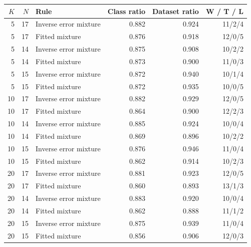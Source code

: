 \begin{tabular}{rrlrrr}
\toprule
$K$ & $N$ & Rule & Class ratio & Dataset ratio & W / T / L \\
\midrule
5 & 17 & Inverse error mixture & 0.882 & 0.924 & 11/2/4 \\
5 & 17 & Fitted mixture & 0.876 & 0.918 & 12/0/5 \\
5 & 14 & Inverse error mixture & 0.875 & 0.908 & 10/2/2 \\
5 & 14 & Fitted mixture & 0.873 & 0.900 & 11/0/3 \\
5 & 15 & Inverse error mixture & 0.872 & 0.940 & 10/1/4 \\
5 & 15 & Fitted mixture & 0.872 & 0.935 & 10/0/5 \\
10 & 17 & Inverse error mixture & 0.882 & 0.929 & 12/0/5 \\
10 & 17 & Fitted mixture & 0.864 & 0.900 & 12/2/3 \\
10 & 14 & Inverse error mixture & 0.885 & 0.924 & 10/0/4 \\
10 & 14 & Fitted mixture & 0.869 & 0.896 & 10/2/2 \\
10 & 15 & Inverse error mixture & 0.876 & 0.946 & 11/0/4 \\
10 & 15 & Fitted mixture & 0.862 & 0.914 & 10/2/3 \\
20 & 17 & Inverse error mixture & 0.881 & 0.923 & 12/0/5 \\
20 & 17 & Fitted mixture & 0.860 & 0.893 & 13/1/3 \\
20 & 14 & Inverse error mixture & 0.883 & 0.920 & 10/0/4 \\
20 & 14 & Fitted mixture & 0.862 & 0.888 & 11/1/2 \\
20 & 15 & Inverse error mixture & 0.875 & 0.939 & 11/0/4 \\
20 & 15 & Fitted mixture & 0.856 & 0.906 & 12/0/3 \\
\bottomrule
\end{tabular}
